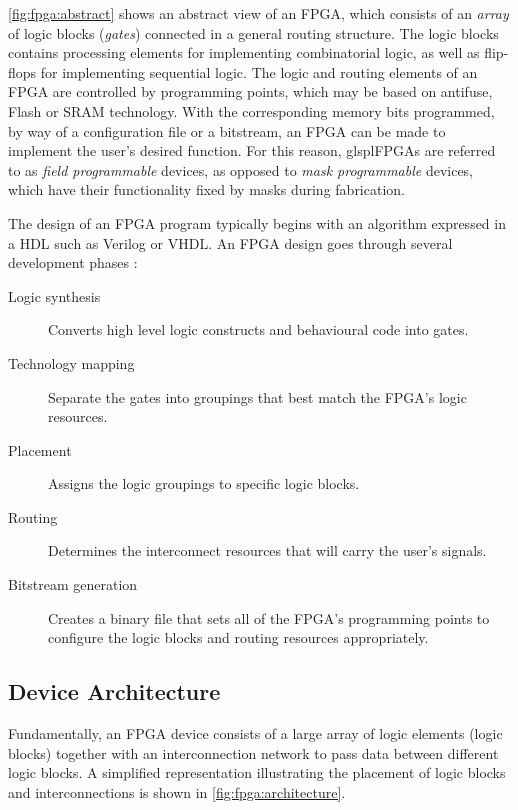\autoref{fig:fpga:abstract} shows an abstract view of an \gls{FPGA}, which
consists of an \emph{array} of logic blocks (\emph{gates}) connected in a
general routing structure. The logic blocks contains processing elements for
implementing combinatorial logic, as well as flip-flops for implementing
sequential logic. The logic and routing elements of an \gls{FPGA} are controlled
by programming points, which may be based on antifuse, Flash  or \gls{SRAM}
technology. With the corresponding memory bits programmed, by way of a
configuration file or a bitstream, an \gls{FPGA} can be made to implement the
user's desired function. For this reason, glspl{FPGAs} are referred to as
\emph{field programmable} devices, as opposed to \emph{mask programmable}
devices, which have their  functionality fixed by masks during fabrication.

The design of an \gls{FPGA} program typically begins with an algorithm expressed
in a \gls{HDL} such as Verilog or \gls{VHDL}. An \gls{FPGA} design goes through
several development phases \cite{Hauck:2007}:
\begin{description}
    \item[Logic synthesis] Converts high level logic constructs and behavioural
        code into gates.
    \item[Technology mapping] Separate the gates into groupings that best match
        the \gls{FPGA}'s logic resources.
    \item[Placement] Assigns the logic groupings to specific logic blocks.
    \item[Routing] Determines the interconnect resources that will carry the
        user's signals.
    \item[Bitstream generation] Creates a binary file that sets all of the
        \gls{FPGA}'s programming points to configure the logic blocks and
        routing resources appropriately.
\end{description}

\subsection{Device Architecture}
\label{fpga:architecture}
Fundamentally, an \gls{FPGA} device consists of a large array of logic elements
(logic blocks) together with an interconnection network to pass data between
different logic blocks. A simplified representation illustrating the placement
of logic blocks and interconnections is shown in
\autoref{fig:fpga:architecture}.

